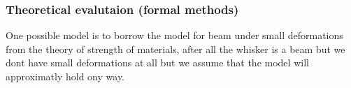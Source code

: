 

\subsubsection{ Theoretical evalutaion (formal methods)}

One possible model is to borrow the model for beam under small
deformations from the theory of strength of materials, after all the
whisker is a beam but we dont have small deformations at all but we
assume that the model will approximatly hold ony way.



